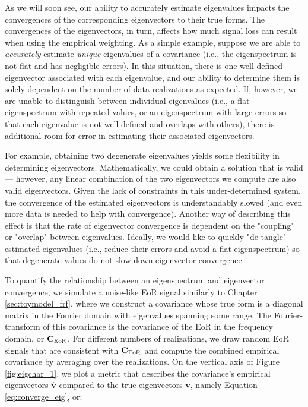 As we will soon see, our ability to accurately estimate eigenvalues impacts the convergences of the corresponding eigenvectors to their true forms. The convergences of the eigenvectors, in turn, affects how much signal loss can result when using the empirical weighting. As a simple example, suppose we are able to \textit{accurately} estimate \textit{unique} eigenvalues of a covariance (i.e., the eigenspectrum is not flat and has negligible errors). In this situation, there is one well-defined eigenvector associated with each eigenvalue, and our ability to determine them is solely dependent on the number of data realizations as expected. If, however, we are unable to distinguish between individual eigenvalues (i.e., a flat eigenspectrum with repeated values, or an eigenspectrum with large errors so that each eigenvalue is not well-defined and overlaps with others), there is additional room for error in estimating their associated eigenvectors. 

For example, obtaining two degenerate eigenvalues yields some flexibility in determining eigenvectors. Mathematically, we could obtain a solution that is valid --- however, any linear combination of the two eigenvectors we compute are also valid eigenvectors. Given the lack of constraints in this under-determined system, the convergence of the estimated eigenvectors is understandably slowed (and even more data is needed to help with convergence). Another way of describing this effect is that the rate of eigenvector convergence is dependent on the "coupling" or "overlap" between eigenvalues. Ideally, we would like to quickly "de-tangle" estimated eigenvalues (i.e., reduce their errors and avoid a flat eigenspectrum) so that degenerate values do not slow down eigenvector convergence.

To quantify the relationship between an eigenspectrum and eigenvector convergence, we simulate a noise-like EoR signal similarly to Chapter \ref{sec:toymodel_frf}, where we construct a covariance whose true form is a diagonal matrix in the Fourier domain with eigenvalues spanning some range. The Fourier-transform of this covariance is the covariance of the EoR in the frequency domain, or $\textbf{C}_{\rm EoR}$. For different numbers of realizations, we draw random EoR signals that are consistent with $\textbf{C}_{\rm EoR}$ and compute the combined empirical covariance by averaging over the realizations. On the vertical axis of Figure \ref{fig:eigchar_1}, we plot a metric that describes the covariance's empirical eigenvectors $\widehat{\textbf{v}}$ compared to the true eigenvectors $\textbf{v}$, namely Equation \eqref{eq:converge_eig}, or:

